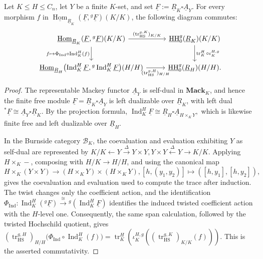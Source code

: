 \documentclass[11pt,oneside]{amsart}
\DeclareMathOperator{\Hom}{Hom}
\DeclareMathOperator{\HH}{HH}
\DeclareMathOperator{\tr}{tr}
\numberwithin{equation}{section}
\numberwithin{figure}{section}
\theoremstyle{plain}
\theoremstyle{definition}
\theoremstyle{remark}
\begin{document}
\begin{lemma}\label{lem:twisted-HS-trace-ind-free}
Let \(K\leq H\leq C_n\), let \(Y\) be a finite \(K\)-set, and set
\(
\underline F:=\underline R_K\square\underline A_Y.
\)
For every morphism \(f\) in \(\underline{\Hom}_{\underline R_K}(\underline F,{}^g\underline F)(K/K)\), the following diagram commutes:
\[
\begin{tikzcd}[column sep=2.7em,row sep=2em]
\underline{\Hom}_{\underline R_K}
(\underline F,{}^g\underline F)(K/K)
  \ar[r,"{(\tr_{\mathrm{HS}}^{g,K})_{K/K}}"]
  \ar[d,"{f\mapsto
  \Phi_{\operatorname{Ind}}\circ\operatorname{Ind}_K^H(f)}"']
&
\underline{\HH}_0^g(\underline R_K)(K/K)
  \ar[d,"{\tr_K^H\circ\iota_K^{H,g}}"]
\\
\underline{\Hom}_{\underline R_H}
\bigl(\operatorname{Ind}_K^H\underline F,
{}^g\operatorname{Ind}_K^H\underline F\bigr)(H/H)
  \ar[r,"{(\tr_{\mathrm{HS}}^{g,H})_{H/H}}"']
&
\underline{\HH}_0^g(\underline R_H)(H/H).
\end{tikzcd}
\]
\end{lemma}

\begin{proof}
The representable Mackey functor \(\underline A_Y\) is self-dual in
\(\mathbf{Mack}_K\), and hence the finite free module
\(\underline F=\underline R_K\square\underline A_Y\) is left
dualizable over \(\underline R_K\), with left dual
\(
{}^*\underline F
\cong
\underline A_Y\square\underline R_K.
\)
By the projection formula,
\(
\operatorname{Ind}_K^H\underline F
\cong
\underline R_H\square\underline A_{H\times_KY},
\)
which is likewise finite free and left dualizable over
\(\underline R_H\).

In the Burnside category \(\mathcal B_K\), the coevaluation and
evaluation exhibiting \(Y\) as self-dual are represented by
\(
K/K\xleftarrow{\ }Y\xrightarrow{\Delta}Y\times Y,
Y\times Y\xleftarrow{\Delta}Y\xrightarrow{\ }K/K.
\)
Applying \(H\times_K-\), composing with \(H/K\to H/H\), and using the
canonical map
\(
H\times_K(Y\times Y)\to
(H\times_KY)\times(H\times_KY),
[h,(y_1,y_2)]\mapsto([h,y_1],[h,y_2]),
\)
gives the coevaluation and evaluation used to compute the trace after
induction. The twist changes only the coefficient action, and the
identification
\(
\Phi_{\operatorname{Ind}}\colon
\operatorname{Ind}_K^H({}^g\underline F)
\xrightarrow{\cong}
{}^g(\operatorname{Ind}_K^H\underline F)
\)
identifies the induced twisted coefficient action with the
\(H\)-level one. Consequently, the same span calculation, followed by
the twisted Hochschild quotient, gives
\(
(\tr_{\mathrm{HS}}^{g,H})_{H/H}
\bigl(\Phi_{\operatorname{Ind}}\circ
\operatorname{Ind}_K^H(f)\bigr)
=
\tr_K^H\left(
\iota_K^{H,g}\left(
(\tr_{\mathrm{HS}}^{g,K})_{K/K}(f)
\right)\right).
\)
This is the asserted commutativity.
\end{proof}
\end{document}
